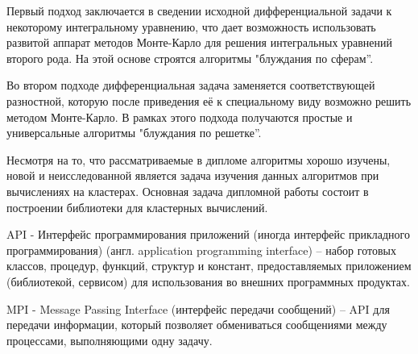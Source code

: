 Первый подход заключается в сведении исходной дифференциальной задачи к некоторому интегральному уравнению, что дает возможность использовать развитой аппарат методов Монте-Карло для решения интегральных уравнений второго рода. На этой основе строятся алгоритмы "блуждания по сферам''.
   
Во втором подходе дифференциальная задача заменяется соответствующей разностной,
которую после приведения её к специальному виду возможно решить
методом Монте-Карло. В рамках этого подхода получаются простые и универсальные алгоритмы "блуждания по решетке''.

Несмотря на то, что рассматриваемые в дипломе алгоритмы хорошо изучены, новой и неисследованной является задача изучения данных алгоритмов при вычислениях на кластерах. Основная задача дипломной работы состоит в  построении библиотеки для кластерных вычислений.  

\newpage{} %

API - Интерфейс программирования приложений (иногда интерфейс прикладного программирования) (англ. application programming interface) -- набор готовых классов, процедур, функций, структур и констант, предоставляемых приложением (библиотекой, сервисом) для использования во внешних программных продуктах. 

MPI - Message Passing Interface (интерфейс передачи сообщений) -- API для передачи информации, который позволяет обмениваться сообщениями между процессами, выполняющими одну задачу.












